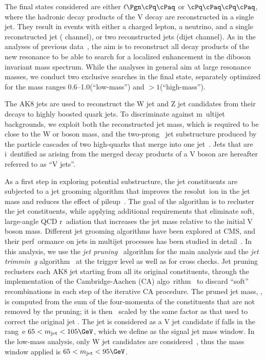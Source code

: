 The final states considered are either $\ell\Pgn\qqbar$ or $\qqbar\qqbar$, where the hadronic decay products of the V decay are
reconstructed in a single jet. They result in events with either a charged lepton, a neutrino, and a single reconstructed jet (\lnujet{} 
channel), or two reconstructed jets (dijet channel). As in the analyses of previous data~\cite{Khachatryan:2014gha, Khachatryan:2014hpa}, 
the aim is to reconstruct all decay products of the new resonance to be able to search for a localized enhancement in the diboson invariant 
mass spectrum. While the analyses in general aim at large resonance masses, we conduct two exclusive searches in the \lnujet{} final state, 
separately optimized for the mass ranges 0.6--1.0\TeV (``low-mass'') and $> 1$\TeV (``high-mass'').

The AK8 jets are used to reconstruct the W jet and Z jet candidates from their decays to highly boosted quark jets. To discriminate against m\
ultijet backgrounds, we exploit both the reconstructed jet mass, which is required to be close to the W or \Zo boson mass, and the two-prong \
jet substructure produced by the particle cascades of two high-\pt quarks that merge into one jet~\cite{Khachatryan:2014vla}. Jets that are i\
dentified as arising from the merged decay products of a V boson are hereafter referred to as ``V jets''.


As a first step in exploring potential substructure, the jet constituents are subjected to a jet grooming algorithm that improves the resolut\
ion in the jet mass and reduces the effect of pileup~\cite{Chatrchyan:2013vbb}.
The goal of the algorithm is to recluster the jet constituents, while applying additional requirements that eliminate soft, large-angle QCD r\
adiation
that increases the jet mass relative to the initial V boson mass. Different jet grooming algorithms have been explored at CMS, and their perf\
ormance on jets in multijet processes has been studied in detail~\cite{Chatrchyan:2013vbb}.
In this analysis, we use the \textit{jet pruning}~\cite{jetpruning1,Ellis:2009me} algorithm for the main analysis and the \textit{jet trimmin\
g} algorithm~\cite{Krohn:2009th} at the trigger level as well as for cross checks.
Jet pruning reclusters each AK8 jet starting from all its original constituents, through the implementation of the Cambridge-Aachen (CA) algo\
rithm~\cite{Catani:1993hr,Dokshitzer:1997in} to discard ``soft'' recombinations in each step of the iterative CA procedure.
The pruned jet mass, \mJ{}, is computed from the sum of the four-momenta of the constituents that are not removed by the pruning; it is then \
scaled by the same factor as that used to correct the original jet \pt. The jet is considered as a V jet candidate if \mJ{} falls in the rang\
e $\SRLOW < \mJ < \SRHIGH\GeV$, which we define as the signal jet mass window. In the low-mass analysis, only W jet candidates are considered\
, thus the mass window applied is $65 < \mJ < 95\GeV$.

